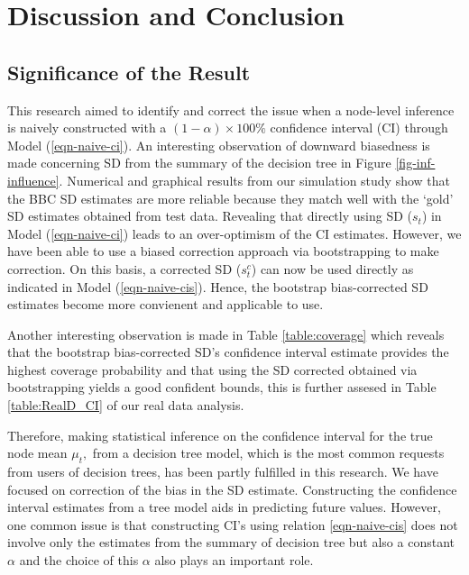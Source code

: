 
\chapter{Discussion and Conclusion}

\section{Significance of the Result}
This research aimed to identify and correct the issue when a node-level inference is naively constructed with a $(1-\alpha) \times 100\%$ confidence interval (CI) through Model (\ref{eqn-naive-ci}). An interesting observation of downward biasedness is made concerning SD from the summary of the decision tree in Figure \ref{fig-inf-influence}. Numerical and graphical results from our simulation study show that the BBC SD estimates are more reliable because they match well with the ‘gold’ SD estimates obtained from test data. Revealing that directly using SD ($s_t$) in Model (\ref{eqn-naive-ci}) leads to an over-optimism of the CI estimates. However, we have been able to use a biased correction approach via bootstrapping to make correction. On this basis, a corrected SD ($s_t^{c}$) can now be used directly as indicated in Model (\ref{eqn-naive-cis}). Hence, the bootstrap bias-corrected SD estimates become more convienent and applicable to use.


Another interesting observation is made in Table \ref{table:coverage} which reveals that the bootstrap bias-corrected SD's confidence interval estimate provides the highest coverage probability and that using the SD corrected obtained via bootstrapping yields a good confident bounds, this is further assesed in Table \ref{table:RealD_CI} of our real data analysis.

Therefore, making statistical inference on the confidence interval for the true node mean $\mu_t,$ from a decision tree model, which is the most common requests from users of decision trees, has been partly fulfilled in this research. We have focused on correction of the bias in the SD estimate. Constructing the confidence interval estimates from a tree model aids in predicting future values. However, one common issue is that constructing CI's using relation \ref{eqn-naive-cis} does not involve only the estimates from the summary of decision tree but also a constant $\alpha$ and the choice of this $\alpha$ also plays an important role.



